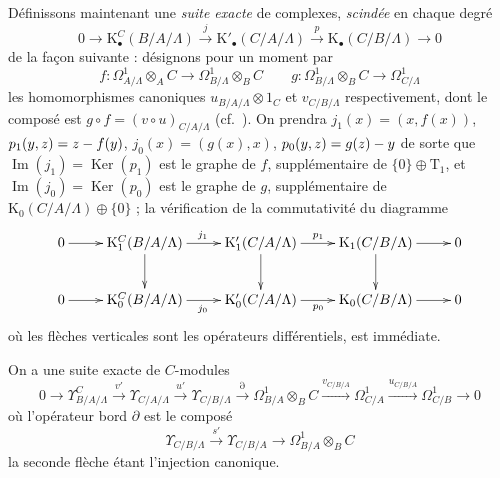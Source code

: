 \begin{env}[20.6.16]
\label{0.20.6.16-fr}
Définissons maintenant une \emph{suite exacte} de complexes, \emph{scindée} en chaque
degré
\begin{equation}
\tag{20.6.16.1}
\label{0.20.6.16.1-fr}
  0\to\mathrm{K}^C_\bullet(B/A/\Lambda)
  \xrightarrow{j}\mathrm{K}'_\bullet(C/A/\Lambda)
  \xrightarrow{p}\mathrm{K}_\bullet(C/B/\Lambda)\to0
\end{equation}
de la façon suivante : désignons pour un moment par
\[
  f:\Omega^1_{A/\Lambda}\otimes_A C\to
    \Omega^1_{B/\Lambda}\otimes_B C
  \qquad
  g:\Omega^1_{B/\Lambda}\otimes_B C\to\Omega^1_{C/\Lambda}
\]
les homomorphismes canoniques $u_{B/A/\Lambda}\otimes1_C$ et
$v_{C/B/\Lambda}$ respectivement, dont le composé est
$g\circ f=(v\circ u)_{C/A/\Lambda}$ (cf.\ ).
On prendra $j_1(x)=(x,f(x))$, $p_1(y,z)=z- f(y)$,
$j_0(x)=(g(x),x)$, $p_0(y,z)=g(z)- y$ de sorte que
$\operatorname{Im}(j_1)=\operatorname{Ker}(p_1)$ est le graphe de $f$,
supplémentaire de $\{0\}\oplus\mathrm{T}_1$, et
$\operatorname{Im}(j_0)=\operatorname{Ker}(p_0)$ est le graphe de $g$,
supplémentaire de $\mathrm{K}_0(C/A/\Lambda)\oplus\{0\}$ ; la vérification
de la commutativité du diagramme
\[
\xymatrix{
  0 \ar[r] & \mathrm{K}^C_1(B/A/\Lambda) \ar[r]^{j_1} \ar[d] &
  \mathrm{K}'_1(C/A/\Lambda) \ar[r]^{p_1} \ar[d] &
  \mathrm{K}_1(C/B/\Lambda) \ar[r] \ar[d] & 0 \\
  0 \ar[r] & \mathrm{K}^C_0(B/A/\Lambda) \ar[r]_{j_0} &
  \mathrm{K}'_0(C/A/\Lambda) \ar[r]_{p_0} &
  \mathrm{K}_0(C/B/\Lambda) \ar[r] & 0
}
\]
où les flèches verticales sont les opérateurs différentiels, est immédiate.
\end{env}

\begin{theorem}[20.6.17]
\label{0.20.6.17-fr}
On a une suite exacte de $C$-modules
\begin{equation}
\tag{20.6.17.1}
\label{0.20.6.17.1-fr}
  0\to\Upsilon^C_{B/A/\Lambda}\xrightarrow{v'}
  \Upsilon_{C/A/\Lambda}\xrightarrow{u'}
  \Upsilon_{C/B/\Lambda}\xrightarrow{\partial}
  \Omega^1_{B/A}\otimes_B C\xrightarrow{v_{C/B/A}}
  \Omega^1_{C/A}\xrightarrow{u_{C/B/A}}\Omega^1_{C/B}\to0
\end{equation}
où l'opérateur bord $\partial$ est le composé
\begin{equation}
\tag{20.6.17.2}
\label{0.20.6.17.2-fr}
  \Upsilon_{C/B/\Lambda}\xrightarrow{s'}\Upsilon_{C/B/A}
  \longrightarrow\Omega^1_{B/A}\otimes_B C
\end{equation}
la seconde flèche étant l'injection canonique.
\end{theorem}


